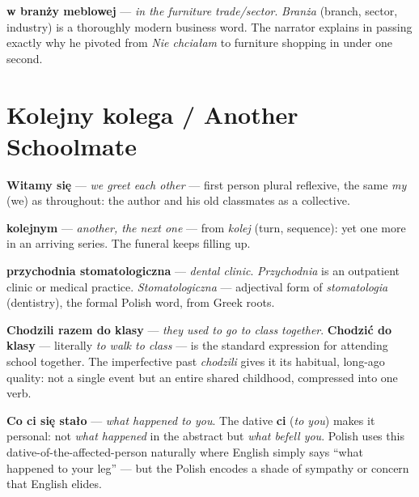 \textbf{w branży meblowej} --- \textit{in the furniture trade/sector}.
\textit{Branża} (branch, sector, industry) is a thoroughly modern
business word. The narrator explains in passing exactly why he pivoted
from \textit{Nie chciałam} to furniture shopping in under one second.

\section{Kolejny kolega / Another Schoolmate}


\textbf{Witamy się} --- \textit{we greet each other} --- first person
plural reflexive, the same \textit{my} (we) as throughout: the author
and his old classmates as a collective.

\textbf{kolejnym} --- \textit{another, the next one} --- from
\textit{kolej} (turn, sequence): yet one more in an arriving series.
The funeral keeps filling up.

\textbf{przychodnia stomatologiczna} --- \textit{dental clinic}.
\textit{Przychodnia} is an outpatient clinic or medical practice.
\textit{Stomatologiczna} --- adjectival form of \textit{stomatologia}
(dentistry), the formal Polish word, from Greek roots.

\textbf{Chodzili razem do klasy} --- \textit{they used to go to class
together}. \textbf{Chodzić do klasy} --- literally \textit{to walk to
class} --- is the standard expression for attending school together.
The imperfective past \textit{chodzili} gives it its habitual,
long-ago quality: not a single event but an entire shared childhood,
compressed into one verb.



\textbf{Co ci się stało} --- \textit{what happened to you}. The dative
\textbf{ci} (\textit{to you}) makes it personal: not \textit{what
happened} in the abstract but \textit{what befell you}. Polish uses
this dative-of-the-affected-person naturally where English simply says
``what happened to your leg'' --- but the Polish encodes a shade of
sympathy or concern that English elides.

